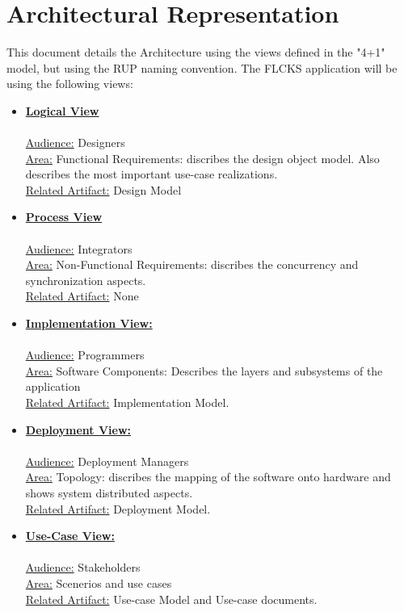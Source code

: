 \documentclass{article}
\begin{document}
\section{Architectural Representation}
This document details the Architecture using the views defined in the "4+1" model, but using the RUP naming convention. The FLCKS application will be using the following views:
\begin{itemize}
\item \textbf{\underline{Logical View}}\\\\ \underline{Audience:} Designers\\ \underline{Area:} Functional Requirements: discribes the design object model. Also describes the most important use-case realizations.\\ \underline{Related Artifact:} Design Model

\item \textbf{\underline{Process View}}\\\\ \underline{Audience:} Integrators\\ \underline{Area:} Non-Functional Requirements: discribes the concurrency and synchronization aspects.\\ \underline{Related Artifact:} None


\item \textbf{\underline{Implementation View:}}\\\\ \underline{Audience:} Programmers\\ \underline{Area:} Software Components: Describes the layers and subsystems of the application\\ \underline{Related Artifact:} Implementation Model.

\item \textbf{\underline{Deployment View:}}\\\\ \underline{Audience:} Deployment Managers\\ \underline{Area:} Topology: discribes the mapping of the software onto hardware and shows system distributed aspects.\\ \underline{Related Artifact:} Deployment Model.

\item \textbf{\underline{Use-Case View:}}\\\\ \underline{Audience:} Stakeholders\\ \underline{Area:} Scenerios and use cases\\ \underline{Related Artifact:} Use-case Model and Use-case documents.

\end{itemize} 
\end{document}
